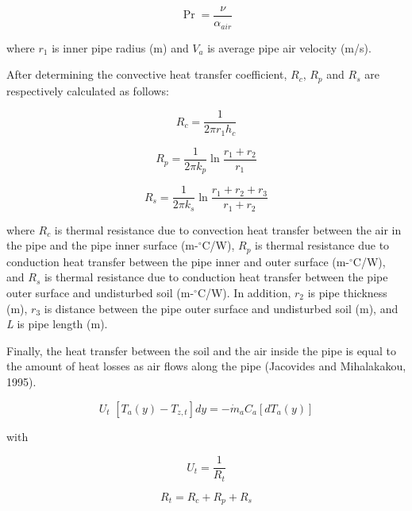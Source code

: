 \begin{equation}
\Pr  = \frac{\nu }{{{\alpha_{air}}}}
\end{equation}

where \(r_{1}\) is inner pipe radius (m) and \(V_{a}\) is average pipe air velocity (m/s).

After determining the convective heat transfer coefficient, \(R_{c}\), \(R_{p}\) and \(R_{s}\) are respectively calculated as follows:

\begin{equation}
{R_c} = \frac{1}{{2\pi {r_1}{h_c}}}
\end{equation}

\begin{equation}
{R_p} = \frac{1}{{2\pi {k_p}}}\ln \frac{{{r_1} + {r_2}}}{{{r_1}}}
\end{equation}

\begin{equation}
{R_s} = \frac{1}{{2\pi {k_s}}}\ln \frac{{{r_1} + {r_2} + {r_3}}}{{{r_1} + {r_2}}}
\end{equation}

where \(R_{c}\) is thermal resistance due to convection heat transfer between the air in the pipe and the pipe inner surface (m-\(^{\circ}\)C/W), \(R_{p}\) is thermal resistance due to conduction heat transfer between the pipe inner and outer surface (m-\(^{\circ}\)C/W), and \(R_{s}\) is thermal resistance due to conduction heat transfer between the pipe outer surface and undisturbed soil (m-\(^{\circ}\)C/W). In addition, \(r_{2}\) is pipe thickness (m), \(r_{3}\) is distance between the pipe outer surface and undisturbed soil (m), and \emph{L} is pipe length (m).

Finally, the heat transfer between the soil and the air inside the pipe is equal to the amount of heat losses as air flows along the pipe (Jacovides and Mihalakakou, 1995).

\begin{equation}
{U_t}\,\,\left[ {{T_a}(y) - {T_{z,t}}} \right]dy =  - {\dot m_a}{C_a}\left[ {d{T_a}(y)} \right]
\end{equation}

with

\begin{equation}
{U_t} = \frac{1}{{{R_t}}}
\end{equation}

\begin{equation}
{R_t} = {R_c} + {R_p} + {R_s}
\end{equation}


